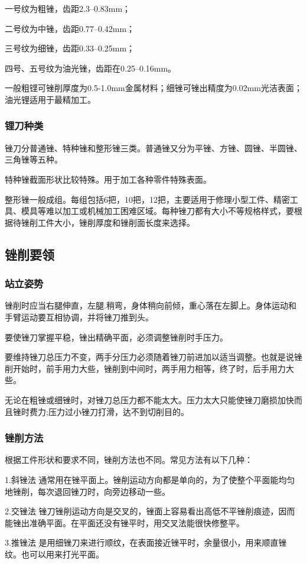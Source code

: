 \documentclass{ctexbook}
\begin{document}
一号纹为粗锉，齿距2.3--0.83mm；

二号纹为中锉，齿距0.77--0.42mm；

三号纹为细锉，齿距0.33--0.25mm；

四号、五号纹为油光锉，齿距在0.25--0.16mm。

一般粗铿可锉削厚度为0.5-1.0mm金属材料；细锉可锉出精度为0.02mm光洁表面；油光锂适用于最精加工。
\subsubsection{锂刀种类}
锉刀分普通锉、特种锉和整形锉三类。普通锉又分为平锉、方锉、圆锉、半圆锉、三角锉等五种。

特种锉截面形状比较特殊。用于加工各种零件特殊表面。

整形锉一般成组。每组包括6把，10把，12把，主要适用于修理小型工件、精密工具、模具等难以加工或机械加工困难区域。每种锉刀都有大小不等规格样式，要根据待锉削工件大小，锉削厚度和锉削面长度来选择。
\subsection{锉削要领}
\subsubsection{站立姿势}
锉削时应当右腿伸直，左腿.稍弯，身体稍向前倾，重心落在左脚上。身体运动和手臂运动要互相协调，并将锉刀推到头。

要使锉刀掌握平稳，锉出精确平面，必须调整锉削时手压力。

要维持锉刀总压力不变，两手分压力必须随着锉刀前进加以适当调整。也就是说锉削开始时，前手用力大些，锉削到中间时，两手用力相等，终了时，后手用力大些。

无论在粗锉或细锉时，对锉刀总压力都不能太大。压力太大只能使锉刀磨损加快而且锉时费力;压力过小锉刀打滑，达不到切削目的。
\subsubsection{锉削方法}
根据工件形状和要求不同，锉削方法也不同。常见方法有以下几种：

1.斜锉法 通常用在锉平面上。锉削运动方向都是单向的，为了使整个平面能均匀地锉削，每次退回锉刀时，向旁边移动一些。

2.交锉法 锉刀锉削运动方向是交叉的，锉面上容易看出高低不平锉削痕迹，因而能锉出准确平面。在平面还没有锉平时，用交叉法能很快修整平。

3.推锉法 是用细锉刀来进行顺纹，在表面接近锉平时，余量很小，用来顺直锉纹。也可以用来打光平面。
\end{document}
